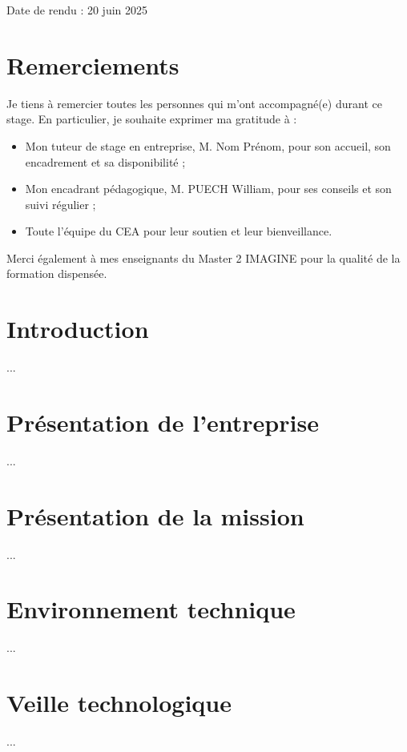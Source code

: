 \documentclass[12pt,a4paper]{report}
\begin{document}
\begin{titlepage}
\begin{center}
\vfill
{\small Date de rendu : 20 juin 2025}

\end{center}
\end{titlepage}

\chapter*{Remerciements}

Je tiens à remercier toutes les personnes qui m'ont accompagné(e) durant ce stage. En particulier, je souhaite exprimer ma gratitude à :
\begin{itemize}
  \item Mon tuteur de stage en entreprise, M. Nom Prénom, pour son accueil, son encadrement et sa disponibilité ;
  \item Mon encadrant pédagogique, M. PUECH William, pour ses conseils et son suivi régulier ;
  \item Toute l'équipe du CEA pour leur soutien et leur bienveillance.
\end{itemize}

Merci également à mes enseignants du Master 2 IMAGINE pour la qualité de la formation dispensée.

\tableofcontents
\pagestyle{fancy}
\newpage

\chapter{Introduction}
... %

\chapter{Présentation de l'entreprise}
... %

\chapter{Présentation de la mission}
... %

\chapter{Environnement technique}
... %

\chapter{Veille technologique}
... %
\end{document}
